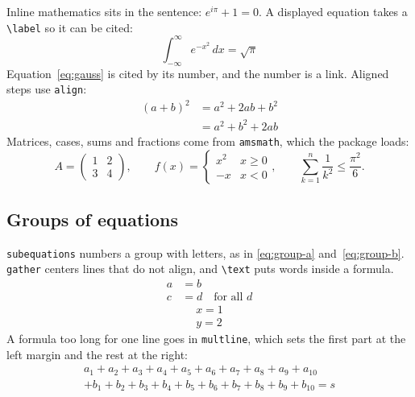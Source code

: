 \documentclass[12pt]{article}
\begin{document}
Inline mathematics sits in the sentence: $e^{i\pi} + 1 = 0$. A displayed
equation takes a \verb|\label| so it can be cited:
\begin{equation}\label{eq:gauss}
  \int_{-\infty}^{\infty} e^{-x^2}\,dx = \sqrt{\pi}
\end{equation}
Equation~\eqref{eq:gauss} is cited by its number, and the number is a link.
Aligned steps use \texttt{align}:
\begin{align}
  (a+b)^2 &= a^2 + 2ab + b^2 \\
          &= a^2 + b^2 + 2ab
\end{align}
Matrices, cases, sums and fractions come from \texttt{amsmath}, which the
package loads:
\begin{equation}
  A = \begin{pmatrix} 1 & 2 \\ 3 & 4 \end{pmatrix}, \qquad
  f(x) = \begin{cases} x^2 & x \ge 0 \\ -x & x < 0 \end{cases}, \qquad
  \sum_{k=1}^{n} \frac{1}{k^2} \le \frac{\pi^2}{6}.
\end{equation}
\subsection{Groups of equations}
\texttt{subequations} numbers a group with letters, as in \eqref{eq:group-a}
and~\eqref{eq:group-b}. \texttt{gather} centers lines that do not align, and
\verb|\text| puts words inside a formula.
\begin{subequations}\label{eq:group}\begin{align}
    a &= b            \label{eq:group-a} \\
    c &= d \quad \text{for all } d \label{eq:group-b}
\end{align}\end{subequations}
\begin{gather} x = 1 \\ y = 2 \end{gather}
A formula too long for one line goes in \texttt{multline}, which sets the first
part at the left margin and the rest at the right:
\begin{multline*}
  a_1 + a_2 + a_3 + a_4 + a_5 + a_6 + a_7 + a_8 + a_9 + a_{10} \\
  + b_1 + b_2 + b_3 + b_4 + b_5 + b_6 + b_7 + b_8 + b_9 + b_{10} = s
\end{multline*}
\end{document}
